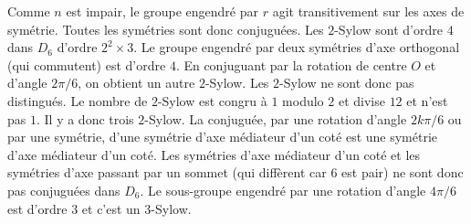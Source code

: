{\begin{enumerate}
{ Comme $n$ est impair, le groupe engendré par $r$ agit transitivement sur les axes de symétrie. Toutes les symétries sont donc conjuguées.
Les $2$-Sylow sont d'ordre $4$ dans $D_{6}$ d'ordre $2^2\times 3$.
 Le groupe engendré par deux symétries d'axe orthogonal (qui commutent) est d'ordre $4$. En conjuguant par la rotation de centre $O$ et d'angle $2\pi/6$, on obtient un autre $2$-Sylow.
 Les $2$-Sylow ne sont donc pas distingués. Le nombre de $2$-Sylow est congru à $1$ modulo $2$ et divise $12$ et n'est pas $1$.
 Il y a donc trois $2$-Sylow.
La conjuguée, par une rotation d'angle $2k\pi/6$ ou par une symétrie, d'une symétrie d'axe médiateur d'un coté est une symétrie d'axe médiateur d'un coté. 
 Les symétries d'axe médiateur d'un coté et les symétries d'axe passant par un sommet (qui diffèrent car $6$ est pair) ne sont donc pas conjuguées dans $D_{6}$.
Le sous-groupe engendré par une rotation d'angle $4\pi/6$ est d'ordre $3$ et c'est un $3$-Sylow.
}
\end{enumerate}
}

